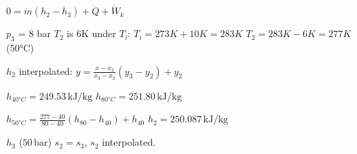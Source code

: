 \( 0 = \dot{m} (h_2 - h_3) + \dot{Q} + \dot{W}_k \)  

\( p_3 \) = 8 bar  
\( T_2 \) is 6K under \( T_i \):  
\( T_i = 273K + 10K = 283K \)  
\( T_2 = 283K - 6K = 277K \) (50°C)  

\( h_2 \) interpolated:  
\( y = \frac{x - x_2}{x_3 - x_2} (y_3 - y_2) + y_2 \)  

\( h_{40°C} = 249.53 \, \text{kJ/kg} \)  
\( h_{80°C} = 251.80 \, \text{kJ/kg} \)  

\( h_{50°C} = \frac{277 - 40}{80 - 40} (h_{80} - h_{40}) + h_{40} \)  
\( h_2 = 250.087 \, \text{kJ/kg} \)  

\( h_3 \) (\( 50 \, \text{bar} \))  
\( s_2 = s_3 \), \( s_2 \) interpolated.
